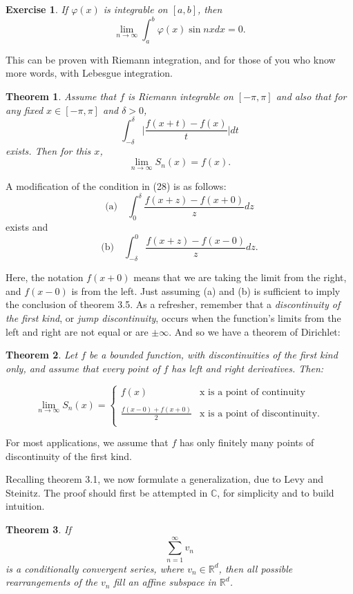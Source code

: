 \documentclass{article}
\newtheorem{thm}{Theorem}[section]
\newtheorem{exer}{Exercise}[section]
\begin{document}
\begin{exer}
If $\varphi(x)$ is integrable on $[a,b]$, then
$$
\lim_{n \to \infty} \int _{a}^{b} \varphi(x)\sin nxdx = 0.
$$
\end{exer}

This can be proven with Riemann integration, and for those of you who know more words, with Lebesgue integration.


\begin{thm}
Assume that $f$ is Riemann integrable on $[-\pi,\pi]$ and also that for any fixed $x \in [-\pi,\pi]$ and $\delta>0$,
\begin{equation}
\int_{-\delta}^{\delta} \Big| \frac{f(x+t) -f(x)}{t} \Big| dt
\end{equation}
exists. Then for this $x$,
$$
\lim_{n \to \infty} S_{n}(x) = f(x).
$$
\end{thm}

A modification of the condition in (28) is as follows:
$$
\text{(a)} \quad \int_{0}^{\delta}  \frac{f(x+z) -f(x+0)}{z}  dz
$$
exists and
$$
\text{(b)} \quad  \int_{-\delta}^{0}  \frac{f(x+z) -f(x-0)}{z}  dz.
$$

Here, the notation $f(x+0)$ means that we are taking the limit from the right, and $f(x-0)$ is from the left. Just assuming (a) and (b) is sufficient to imply the conclusion of theorem 3.5. As a refresher, remember that a \textit{discontinuity of the first kind}, or \textit{jump discontinuity},  occurs when the function's limits from the left and right are not equal or are $\pm \infty$. And so we have a theorem of Dirichlet:

\begin{thm}
Let $f$ be a bounded function, with discontinuities of the first kind only, and assume that every point of $f$ has left and right derivatives. Then:

\[ \lim_{n \to \infty} S_{n}(x) =   \left\{
\begin{array}{ll}
      f(x) &  \text{x is a point of continuity} \\
      \\
      \frac{f(x-0)+f(x+0)}{2} &  \text{x is a point of discontinuity.}  \\
\end{array} 
\right. \]
\end{thm}
For most applications, we assume that $f$ has only finitely many points of discontinuity of the first kind.

Recalling theorem 3.1, we now formulate a generalization, due to Levy and Steinitz. The proof should first be attempted in $\mathbb{C}$, for simplicity and to build intuition.
\begin{thm}
If 
$$\sum_{n=1}^{\infty} v_{n}$$
is a conditionally convergent series, where $v_{n} \in \mathbb{R}^{d}$, then all possible rearrangements of the $v_{n}$ fill an affine subspace in $\mathbb{R}^d$.
\end{thm}
\end{document}
